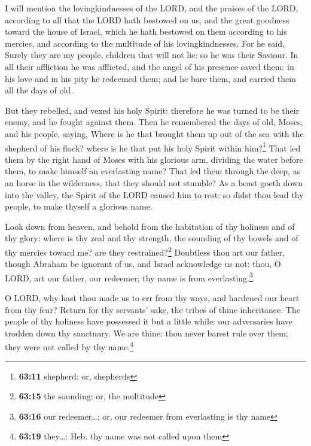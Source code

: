  I will mention the lovingkindnesses of the LORD, and the
praises of the LORD, according to all that the LORD hath bestowed on us,
and the great goodness toward the house of Israel, which he hath
bestowed on them according to his mercies, and according to the
multitude of his lovingkindnesses.  For he said, Surely
they are my people, children that will not lie: so he was their Saviour.
 In all their affliction he was afflicted, and the angel
of his presence saved them: in his love and in his pity he redeemed
them; and he bare them, and carried them all the days of old.

 But they rebelled, and vexed his holy Spirit: therefore
he was turned to be their enemy, and he fought against them.
 Then he remembered the days of old, Moses, and his
people, saying, Where is he that brought them up out of the sea with the
shepherd of his flock? where is he that put his holy Spirit within
him?\footnote{\textbf{63:11} shepherd: or, shepherds} 
That led them by the right hand of Moses with his glorious arm, dividing
the water before them, to make himself an everlasting name?
 That led them through the deep, as an horse in the
wilderness, that they should not stumble?  As a beast
goeth down into the valley, the Spirit of the LORD caused him to rest:
so didst thou lead thy people, to make thyself a glorious name.

 Look down from heaven, and behold from the habitation of
thy holiness and of thy glory: where is thy zeal and thy strength, the
sounding of thy bowels and of thy mercies toward me? are they
restrained?\footnote{\textbf{63:15} the sounding: or, the multitude}
 Doubtless thou art our father, though Abraham be
ignorant of us, and Israel acknowledge us not: thou, O LORD, art our
father, our redeemer; thy name is from everlasting.\footnote{\textbf{63:16}
  our redeemer\ldots: or, our redeemer from everlasting is thy name}

 O LORD, why hast thou made us to err from thy ways, and
hardened our heart from thy fear? Return for thy servants' sake, the
tribes of thine inheritance.  The people of thy holiness
have possessed it but a little while: our adversaries have trodden down
thy sanctuary.  We are thine: thou never barest rule over
them; they were not called by thy name.\footnote{\textbf{63:19}
  they\ldots: Heb. thy name was not called upon them}

